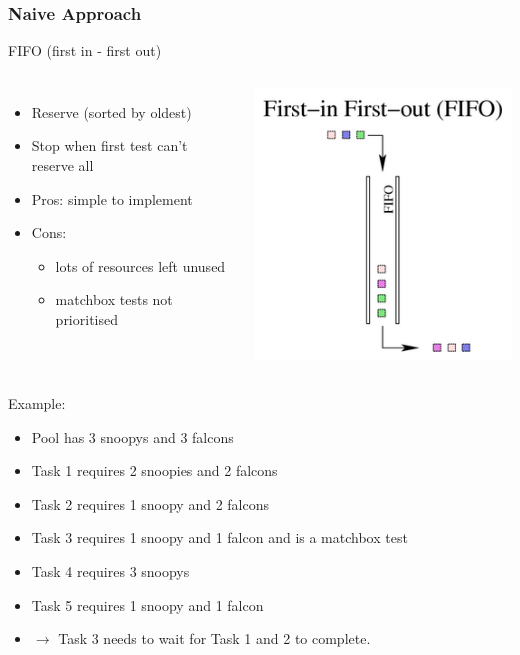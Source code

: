 \documentclass[xcolor=pdftex,dvipsnames,table]{beamer}
\begin{document}
\begin{frame}
\frametitle{Naive Approach}
FIFO (first in - first out)
\begin{columns}[cc]
\column{2.0in}
\begin{itemize}
  \item Reserve (sorted by oldest)
  \item Stop when first test can't reserve all
  \item Pros: simple to implement
  \item Cons: 
    \begin{itemize}
      \item lots of resources left unused
      \item matchbox tests not prioritised
    \end{itemize}
\end{itemize}
\column{0.5in}
\includegraphics[scale=0.33]{fifo.png}
\end{columns}
\end{frame}

\begin{frame}
Example:
\begin{itemize}
  \item Pool has 3 snoopys and 3 falcons
  \item Task 1 requires 2 snoopies and 2 falcons
  \item Task 2 requires 1 snoopy and 2 falcons
  \item Task 3 requires 1 snoopy and 1 falcon and is a matchbox test
  \item Task 4 requires 3 snoopys
  \item Task 5 requires 1 snoopy and 1 falcon
  \item $\rightarrow$ Task 3 needs to wait for Task 1 and 2 to complete.
\end{itemize}
\end{frame}
\end{document}
